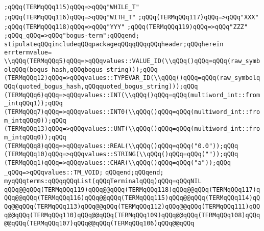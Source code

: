 \verb|;qQQq(TERMqQQq115)qQQq=>qQQq"WHILE_T"|\newline
\verb|;qQQq(TERMqQQq116)qQQq=>qQQq"WITH_T"|\newline
\verb|;qQQq(TERMqQQq117)qQQq=>qQQq"XXX"|\newline
\verb|;qQQq(TERMqQQq118)qQQq=>qQQq"YYY"|\newline
\verb|;qQQq(TERMqQQq119)qQQq=>qQQq"ZZZ"|\newline
\verb|;qQQq_qQQq=>qQQq"bogus-term";qQQqend;|\newline
\verb|stipulateqQQqincludeqQQqpackageqQQqqQQqqQQqheader;qQQqherein|\newline
\verb|errtermvalue=|\newline
\verb|\\qQQq(TERMqQQq5)qQQq=>qQQqvalues::VALUE_ID(\\qQQq()qQQq=qQQq(raw_symbolqQQq(bogus_hash,qQQqbogus_string)));qQQq|\newline
\verb|(TERMqQQq12)qQQq=>qQQqvalues::TYPEVAR_ID(\\qQQq()qQQq=qQQq(raw_symbolqQQq(quoted_bogus_hash,qQQqquoted_bogus_string)));qQQq|\newline
\verb|(TERMqQQq6)qQQq=>qQQqvalues::INT(\\qQQq()qQQq=qQQq(multiword_int::from_intqQQq1));qQQq|\newline
\verb|(TERMqQQq7)qQQq=>qQQqvalues::INT0(\\qQQq()qQQq=qQQq(multiword_int::from_intqQQq0));qQQq|\newline
\verb|(TERMqQQq13)qQQq=>qQQqvalues::UNT(\\qQQq()qQQq=qQQq(multiword_int::from_intqQQq0));qQQq|\newline
\verb|(TERMqQQq8)qQQq=>qQQqvalues::REAL(\\qQQq()qQQq=qQQq("0.0"));qQQq|\newline
\verb|(TERMqQQq10)qQQq=>qQQqvalues::STRING(\\qQQq()qQQq=qQQq(""));qQQq|\newline
\verb|(TERMqQQq1)qQQq=>qQQqvalues::CHAR(\\qQQq()qQQq=qQQq("a"));qQQq|\newline
\verb|_qQQq=>qQQqvalues::TM_VOID;|\newline
\verb|qQQqend;qQQqend;|\newline
\verb|myqQQqterms:qQQqqQQqList(qQQqTerminalqQQq)qQQq=qQQqNIL|\newline
\verb|qQQq@@qQQq(TERMqQQq119)qQQq@@qQQq(TERMqQQq118)qQQq@@qQQq(TERMqQQq117)qQQq@@qQQq(TERMqQQq116)qQQq@@qQQq(TERMqQQq115)qQQq@@qQQq(TERMqQQq114)qQQq@@qQQq(TERMqQQq113)qQQq@@qQQq(TERMqQQq112)qQQq@@qQQq(TERMqQQq111)qQQq@@qQQq(TERMqQQq110)qQQq@@qQQq(TERMqQQq109)qQQq@@qQQq(TERMqQQq108)qQQq@@qQQq(TERMqQQq107)qQQq@@qQQq(TERMqQQq106)qQQq@@qQQq|\newline
